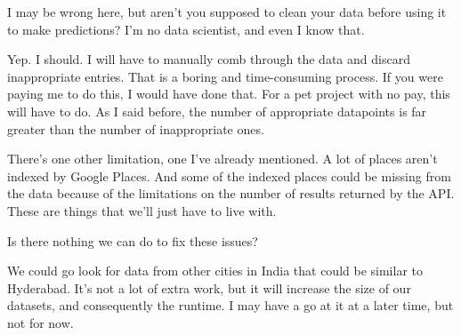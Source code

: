 {\color{blue} I may be wrong here, but aren't you supposed to clean your data before using it to make predictions? I'm no data scientist, and even I know that.}

Yep. I should. I will have to manually comb through the data and discard inappropriate entries. That is a boring and time-consuming process. If you were paying me to do this, I would have done that. For a pet project with no pay, this will have to do. As I said before, the number of appropriate datapoints is far greater than the number of inappropriate ones. 

There's one other limitation, one I've already mentioned. A lot of places aren't indexed by Google Places. And some of the indexed places could be missing from the data because of the limitations on the number of results returned by the API. These are things that we'll just have to live with.  

{\color{blue} Is there nothing we can do to fix these issues?}

We could go look for data from other cities in India that could be similar to Hyderabad. It's not a lot of extra work, but it will increase the size of our datasets, and consequently the runtime. I may have a go at it at a later time, but not for now. 
